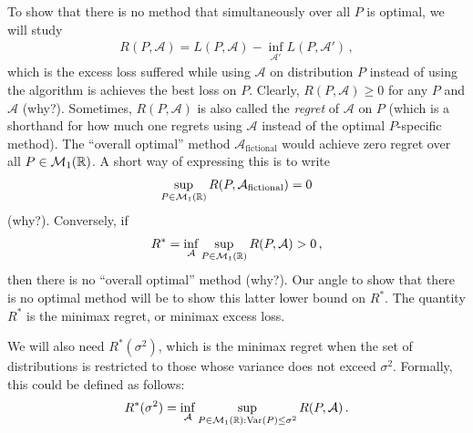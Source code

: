\documentclass{article}
\newcommand{\R}{\mathbb{R}}
\DeclareMathOperator*{\1}{\mathbbm{1}}
\theoremstyle{definition}
\theoremstyle{remark}
\newcommand{\cA}{\mathcal{A}}
\begin{document}
To show that there is no method that simultaneously over all $P$ is optimal, we will study
\begin{align*}
R(P,\cA) = L(P,\cA) - \inf_{\cA'} L(P,\cA')\,,
\end{align*}
which is the excess loss suffered while using $\cA$ on distribution $P$ instead of using the algorithm is achieves the best loss on $P$. Clearly, $R(P,\cA)\ge 0$ for any $P$ and $\cA$ (why?).
Sometimes, $R(P,\cA)$ is also called the \emph{regret} of $\cA$ on $P$ (which is a shorthand for how much one regrets using $\cA$ instead of the optimal $P$-specific method).
The ``overall optimal'' method $\cA_{\text{fictional}}$ would achieve zero regret over all $P\in \cM_1(\R)$.
A short way of expressing this is to write
\begin{align*}
\sup_{P\in \cM_1(\R)} R(P,\cA_{\text{fictional}})=0
\end{align*}
(why?).
Conversely, if 
\begin{align*}
R^* = \inf_{\cA} \sup_{P\in \cM_1(\R)} R(P,\cA) > 0\,,
\end{align*}
then there is no ``overall optimal'' method (why?). 
Our angle to show that there is no optimal method will be to show this latter lower bound on $R^*$.
The quantity $R^*$ is the minimax regret, or minimax excess loss. 

We will also need $R^*(\sigma^2)$, which is the minimax regret when the set of distributions is restricted to those whose variance does not exceed $\sigma^2$.
Formally, this could be defined as follows:
\begin{align*}
R^*(\sigma^2)=\inf_{\cA} \sup_{P\in \cM_1(\R): \mathrm{Var}(P)\le \sigma^2} R(P,\cA)\,.
\end{align*}
\end{document}
